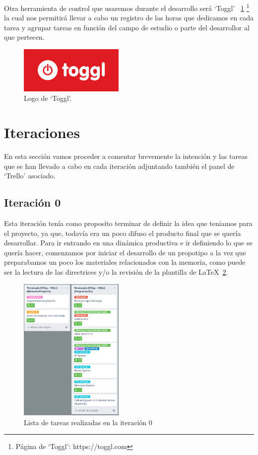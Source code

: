 Otra herramienta de control que usaremos durante el desarrollo será `Toggl'
~\ref{img:logo_toggl} \footnote{Página de `Toggl': https://toggl.com}
la cual nos permitirá llevar a cabo un registro de las horas que dedicamos en cada tarea
y agrupar tareas en función del campo de estudio o parte del desarrollor al que pertecen.

\begin{figure}[ht]
\centering
\includegraphics[width=0.45\textwidth]{imagenes/metodologia/logo-toggl.png}
\caption{Logo de `Toggl'.}
\label{img:logo_toggl}
\end{figure}

\section{Iteraciones}
En esta sección vamos proceder a comentar brevemente la intención y las tareas que se
han llevado a cabo en cada iteración adjuntando también el panel de `Trello' asociado.

\subsection{Iteración 0}
Esta iteración tenía como proposito terminar de definir la idea que teniamos para el
proyecto, ya que, todavía era un poco difuso el producto final que se quería desarrollar.
Para ir entrando en una dinámica productiva e ir definiendo lo que se quería hacer,
comenzamos por iniciar el desarrollo de un propotipo a la vez que preparabamos un poco
los materiales relacionados con la memoria, como puede ser la lectura de las directrices
y/o la revisión de la plantilla de \LaTeX~\ref{img:it_0}.

\begin{figure}[ht]
\centering
\includegraphics[width=0.45\textwidth]{imagenes/metodologia/tareas_it0.png}
\caption{Lista de tareas realizadas en la iteración 0}
\label{img:it_0}
\end{figure}

